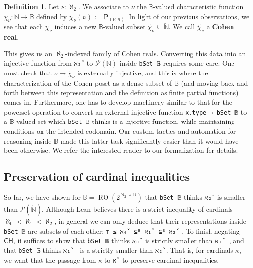\documentclass[a4paper,USenglish,cleveref, autoref]{lipics-v2019}
\newcommand{\B}{\mathbb{B}}
\newcommand{\lil}{\lstinline}
\newcommand{\N}{\mathbb{N}}
\theoremstyle{theorem}
\theoremstyle{definition}
\newtheorem{defn}[definition]{Definition}
\begin{document}
\begin{defn}
  Let $\nu : \aleph_2$. We associate to $\nu$ the $\B$-valued characteristic function $\chi_{\nu} : \N \to \B$ defined by $\chi_{\nu}(n) := \mathbf{P}_{(\nu, n)}$. In light of our previous observations, we see that each $\chi_{\nu}$ induces a new $\B$-valued subset $\widetilde{\chi_{\nu}} \subseteq \check{\N}$. We call $\widetilde{\chi_{\nu}}$ a \textbf{Cohen real}.
\end{defn}
This gives us an $\aleph_2$-indexed family of Cohen reals. Converting this data into an injective function from \lil{ℵ₂̌ } to $\mathcal{P}(\mathbb{N})$ inside \lil{bSet 𝔹} requires some care. One must check that $\nu \mapsto \widetilde{\chi_{\nu}}$ is externally injective, and this is where the characterization of the Cohen poset as a dense subset of $\B$ (and moving back and forth between this representation and the definition as finite partial functions) comes in. Furthermore, one has to develop machinery similar to that for the powerset operation to convert an external injective function \lstinline{x.type → bSet 𝔹} to a $\B$-valued set which \lstinline{bSet 𝔹} thinks is a injective function, while maintaining conditions on the intended codomain. Our custom tactics and automation for reasoning inside $\B$ made this latter task significantly easier than it would have been otherwise. We refer the interested reader to our formalization for details.

\subsection{Preservation of cardinal inequalities} \label{subsect:cardinal-inequalities}
So far, we have shown for $\B = \operatorname{RO}(2^{\aleph_2 \times \mathbb{N}})$ that \lil{bSet 𝔹} thinks \lil{ℵ₂̌ } is smaller than $\mathcal{P}(\check{\mathbb{N}})$. Although Lean believes there is a strict inequality of cardinals $\aleph_0 < \aleph_1 < \aleph_2$, in general we can only deduce that their representations inside \lil{bSet 𝔹} are subsets of each other: %
\lil{⊤ ≤ ℵ₀̌  ⊆ᴮ ℵ₁̌  ⊆ᴮ ℵ₂̌ }
. To finish negating $\mathsf{CH}$, it suffices to show that \lstinline{bSet 𝔹} thinks \lil{ℵ₀̌ } is strictly smaller than \lil{ℵ₁̌  }, and that \lstinline{bSet 𝔹} thinks \lil{ℵ₁̌  } is a strictly smaller than \lil{ℵ₂̌ }. That is, for cardinals $\kappa$, we want that the passage from $\kappa$ to \lil{κ̌ } to preserve cardinal inequalities.
\end{document}
